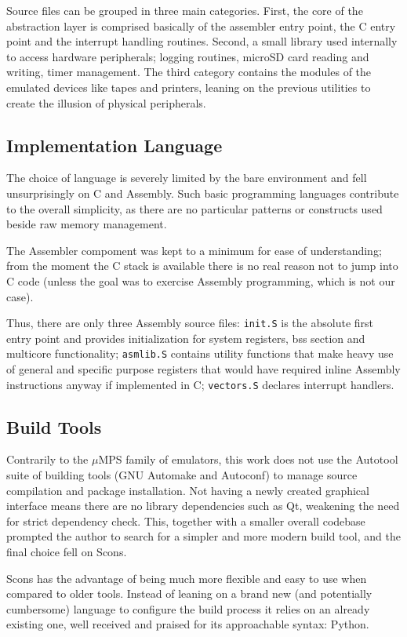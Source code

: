 \documentclass[12pt,a4paper,openright,twoside]{report}
\begin{document}
Source files can be grouped in three main categories. First, the core of the abstraction
layer is comprised basically of the assembler entry point, the C entry point and
the interrupt handling routines. Second, a small library used internally to 
access hardware peripherals; logging routines, microSD card reading and writing, 
timer management. The third category contains the modules of the emulated devices like tapes and
printers, leaning on the previous utilities to create the illusion of physical
peripherals.

\subsection{Implementation Language}
The choice of language is severely limited by the bare environment and fell unsurprisingly
on C and Assembly. Such basic programming languages contribute to the overall simplicity,
as there are no particular patterns or constructs used beside raw memory management.

The Assembler compoment was kept to a minimum for ease of understanding; from
the moment the C stack is available there is no real reason not to jump into 
C code (unless the goal was to exercise Assembly programming, which is not our case).

Thus, there are only three Assembly source files: {\tt init.S} is the absolute first
entry point and provides initialization for system registers, 
bss section and multicore functionality; {\tt asmlib.S} contains utility functions
that make heavy use of general and specific purpose registers that would have
required inline Assembly instructions anyway if implemented in C; {\tt vectors.S}
declares interrupt handlers.

\subsection{Build Tools}
Contrarily to the $\mu$MPS family of emulators, this work does not use the 
Autotool suite of building tools (GNU Automake and Autoconf) to manage source 
compilation and package installation.
Not having a newly created graphical interface means there are no library dependencies
such as Qt, weakening the need for strict dependency check. 
This, together with a smaller overall codebase prompted the author to search 
for a simpler and more modern build tool, and the final choice fell on Scons.

Scons has the advantage of being much more flexible and easy to use when compared
to older tools. Instead of leaning on a brand new (and potentially cumbersome)
language to configure the build process it relies on an already existing one, well
received and praised for its approachable syntax: Python.
\end{document}

